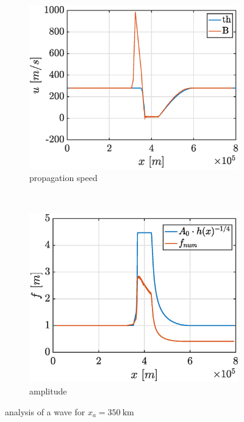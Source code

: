 \documentclass[a4paper,12pt,twoside]{article}
\begin{document}
      \begin{figure}[h]
        \centering
        \begin{subfigure}[t]{0.45\textwidth}
          \includegraphics[width=\textwidth]{graphs/xa350000_tfin15000_u.eps}
          \caption{propagation speed}
          \label{fig:xa350000_u}
        \end{subfigure}
        ~
        \begin{subfigure}[t]{0.45\textwidth}
          \includegraphics[width=\textwidth]{graphs/xa350000_tfin15000_f.eps}
          \caption{amplitude}
          \label{fig:xa350000_f}
        \end{subfigure}
        \caption{analysis of a wave for $x_a = \SI{350}{\kilo\meter}$}
        \label{fig:xa350000}
      \end{figure}
\end{document}

